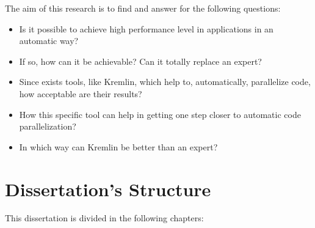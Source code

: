 The aim of this research is to find and answer for the following questions:

\begin{itemize}
	\item Is it possible to achieve high performance level in applications in an automatic way?
	\item If so, how can it be achievable? Can it totally replace an expert?
	\item Since exists tools, like Kremlin, which help to, automatically, parallelize code, how acceptable are their results?
	\item How this specific tool can help in getting one step closer to automatic code parallelization?
	\item In which way can Kremlin be better than an expert?
\end{itemize}


\section{Dissertation's Structure} \label{sec:struct}


This dissertation is divided in the following chapters:

